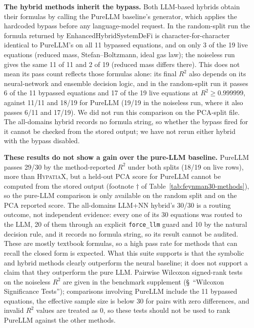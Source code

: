 \documentclass[twoside,11pt]{article}
\newcommand{\Rsq}{R^{2}}
\begin{document}
\textbf{The hybrid methods inherit the bypass.} Both LLM-based hybrids obtain their formulas by calling the
PureLLM baseline's generator, which applies the hardcoded bypass before any language-model request.
In the random-split run the formula returned by
EnhancedHybridSystemDeFi is character-for-character identical to PureLLM's on all 11 bypassed equations, and on only 3 of the
19 live equations (reduced mass, Stefan--Boltzmann, ideal gas law); the noiseless run
gives the same 11 of 11 and 2 of 19 (reduced mass differs there).
This does not mean its pass count reflects those formulas alone: its final $\Rsq$ also depends on its
neural-network and ensemble decision logic, and in the random-split run it passes 6 of the 11 bypassed equations and 17 of the 19 live
equations at $\Rsq \geq 0.999999$, against 11/11 and 18/19 for PureLLM (19/19 in the noiseless run, where it also passes 6/11 and 17/19).
We did not run this comparison on the PCA-split file. The all-domains hybrid records no formula string, so
whether the bypass fired for it cannot be checked from the stored output; we have not rerun either hybrid with the bypass disabled.

\textbf{These results do not show a gain over the pure-LLM baseline.}
PureLLM passes 29/30 by the method-reported $\Rsq$ under both splits (18/19 on live rows), more than \textsc{HypatiaX},
but a held-out PCA score for PureLLM cannot be computed from the stored output (footnote $\dagger$ of
Table~\ref{tab:feynman30-methods}), so the pure-LLM comparison is only available on the random split
and on the PCA reported score. The all-domains LLM+NN hybrid's 30/30 is a routing outcome, not independent
evidence: every one of its 30 equations was routed to the LLM, 20 of them through an explicit
\texttt{force\_llm} guard and 10 by the natural decision rule, and it records no formula string, so its
result cannot be audited. These are mostly textbook formulas, so a high pass rate for methods that can recall the
closed form is expected. What this suite supports is that the symbolic and hybrid methods clearly outperform
the neural baseline; it does not support a claim that they outperform the pure LLM. Pairwise Wilcoxon signed-rank tests on the noiseless
$\Rsq$ are given in the benchmark supplement (\S~``Wilcoxon Significance Tests''); comparisons involving PureLLM include
the 11 bypassed equations, the effective sample size is below 30 for pairs with zero differences, and invalid $\Rsq$ values
are treated as 0, so these tests should not be used to rank PureLLM against the other methods.
\end{document}
